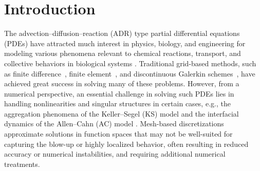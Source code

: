 \documentclass[a4paper,fleqn]{cas-sc}
\theoremstyle{definition}
\theoremstyle{remark}
\begin{document}
\maketitle

\section{Introduction}
The advection--diffusion--reaction (ADR) type partial differential equations (PDEs) have attracted much interest in physics, biology, and engineering for modeling various phenomena relevant to chemical reactions, transport, and collective behaviors in biological systems \cite{hundsdorfer2013numerical}. Traditional grid-based methods, such as finite difference~\cite{hoff1978stability}, finite element~\cite{codina1998comparison}, and discontinuous Galerkin schemes~\cite{ayuso2009discontinuous,xia2009application}, have achieved great success in solving many of these problems. However, from a numerical perspective, an essential challenge in solving such PDEs lies in handling nonlinearities and singular structures in certain cases, e.g., the aggregation phenomena of the Keller--Segel (KS) model \cite{keller1970initiation} and the interfacial dynamics of the Allen--Cahn (AC) model \cite{Allen_Cahn_1979}.  
Mesh-based discretizations approximate solutions in function spaces that may not be well-suited for capturing the blow-up or highly localized behavior, often resulting in reduced accuracy or numerical instabilities, and requiring additional numerical treatments.
\end{document}
